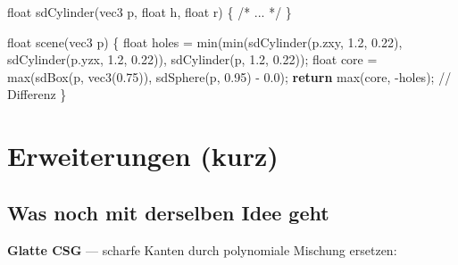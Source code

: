 \documentclass[
  ngerman,
]{article}
\newenvironment{Shaded}{\begin{snugshade}}{\end{snugshade}}
\newcommand{\BuiltInTok}[1]{\textcolor[rgb]{0.00,0.23,0.31}{#1}}
\newcommand{\CommentTok}[1]{\textcolor[rgb]{0.37,0.37,0.37}{#1}}
\newcommand{\DataTypeTok}[1]{\textcolor[rgb]{0.68,0.00,0.00}{#1}}
\newcommand{\FloatTok}[1]{\textcolor[rgb]{0.68,0.00,0.00}{#1}}
\newcommand{\FunctionTok}[1]{\textcolor[rgb]{0.28,0.35,0.67}{#1}}
\newcommand{\KeywordTok}[1]{\textcolor[rgb]{0.00,0.23,0.31}{\textbf{#1}}}
\newcommand{\NormalTok}[1]{\textcolor[rgb]{0.00,0.23,0.31}{#1}}
\newcommand{\OperatorTok}[1]{\textcolor[rgb]{0.37,0.37,0.37}{#1}}
\begin{document}
\begin{Shaded}
\begin{Highlighting}[]
\DataTypeTok{float} \FunctionTok{sdCylinder}\OperatorTok{(}\DataTypeTok{vec3}\NormalTok{ p}\OperatorTok{,} \DataTypeTok{float}\NormalTok{ h}\OperatorTok{,} \DataTypeTok{float}\NormalTok{ r}\OperatorTok{)} \OperatorTok{\{} \CommentTok{/* ... */} \OperatorTok{\}}

\DataTypeTok{float} \FunctionTok{scene}\OperatorTok{(}\DataTypeTok{vec3}\NormalTok{ p}\OperatorTok{)} \OperatorTok{\{}
  \DataTypeTok{float}\NormalTok{ holes }\OperatorTok{=} \BuiltInTok{min}\OperatorTok{(}\BuiltInTok{min}\OperatorTok{(}\FunctionTok{sdCylinder}\OperatorTok{(}\NormalTok{p}\OperatorTok{.}\FunctionTok{zxy}\OperatorTok{,} \FloatTok{1.2}\OperatorTok{,} \FloatTok{0.22}\OperatorTok{),}
                        \FunctionTok{sdCylinder}\OperatorTok{(}\NormalTok{p}\OperatorTok{.}\FunctionTok{yzx}\OperatorTok{,} \FloatTok{1.2}\OperatorTok{,} \FloatTok{0.22}\OperatorTok{)),}
                    \FunctionTok{sdCylinder}\OperatorTok{(}\NormalTok{p}\OperatorTok{,}       \FloatTok{1.2}\OperatorTok{,} \FloatTok{0.22}\OperatorTok{));}
  \DataTypeTok{float}\NormalTok{ core  }\OperatorTok{=} \BuiltInTok{max}\OperatorTok{(}\FunctionTok{sdBox}\OperatorTok{(}\NormalTok{p}\OperatorTok{,} \DataTypeTok{vec3}\OperatorTok{(}\FloatTok{0.75}\OperatorTok{)),}
                    \FunctionTok{sdSphere}\OperatorTok{(}\NormalTok{p}\OperatorTok{,} \FloatTok{0.95}\OperatorTok{)} \OperatorTok{{-}} \FloatTok{0.0}\OperatorTok{);}
  \KeywordTok{return} \BuiltInTok{max}\OperatorTok{(}\NormalTok{core}\OperatorTok{,} \OperatorTok{{-}}\NormalTok{holes}\OperatorTok{);}  \CommentTok{// Differenz}
\OperatorTok{\}}
\end{Highlighting}
\end{Shaded}

\section{Erweiterungen (kurz)}\label{erweiterungen-kurz}

\subsection{Was noch mit derselben Idee
geht}\label{was-noch-mit-derselben-idee-geht}

\textbf{Glatte CSG} --- scharfe Kanten durch polynomiale Mischung
ersetzen:
\end{document}
